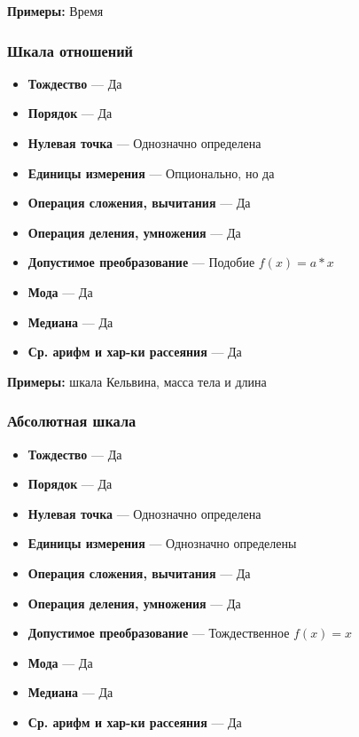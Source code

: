\documentclass{article}
\begin{document}
    \textbf{Примеры: } Время


    \subsubsection{Шкала отношений}


    \begin{itemize}
        \item \textbf{Тождество} --- Да
        \item \textbf{Порядок} --- Да
        \item \textbf{Нулевая точка} --- Однозначно определена
        \item \textbf{Единицы измерения} --- Опционально, но да
        \item \textbf{Операция сложения, вычитания} --- Да
        \item \textbf{Операция деления, умножения} --- Да
        \item \textbf{Допустимое преобразование} --- Подобие $f(x) = a * x$
        \item \textbf{Мода} --- Да
        \item \textbf{Медиана} --- Да
        \item \textbf{Ср. арифм и хар-ки рассеяния} --- Да
    \end{itemize}

    \textbf{Примеры: } шкала Кельвина, масса тела и длина

    \subsubsection{Абсолютная шкала}


    \begin{itemize}
        \item \textbf{Тождество} --- Да
        \item \textbf{Порядок} --- Да
        \item \textbf{Нулевая точка} --- Однозначно определена
        \item \textbf{Единицы измерения} --- Однозначно определены
        \item \textbf{Операция сложения, вычитания} --- Да
        \item \textbf{Операция деления, умножения} --- Да
        \item \textbf{Допустимое преобразование} --- Тождественное $f(x) = x$
        \item \textbf{Мода} --- Да
        \item \textbf{Медиана} --- Да
        \item \textbf{Ср. арифм и хар-ки рассеяния} --- Да
    \end{itemize}
\end{document}
